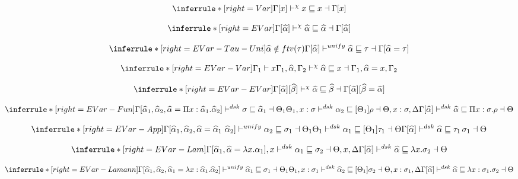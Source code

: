 \[
\inferrule*[right=Var]
{ }
{\Gamma[x] \dskunify x \sqsubseteq x \dashv \Gamma[x] }
\]

\[
\inferrule*[right=EVar]
{ }
{\Gamma[\widehat \alpha ] \dskunify \widehat \alpha \sqsubseteq \widehat \alpha \dashv \Gamma[\widehat \alpha] }
\]


\framebox{$\Gamma[\alpha] \dskunify \widehat \alpha \sqsubseteq \rho \dashv \Theta$}

\[
\inferrule*[right=EVar-Tau-Uni]
{ \widehat \alpha \notin ftv(\tau)} %
{\Gamma[\widehat \alpha ] \unify \widehat \alpha \sqsubseteq \tau \dashv \Gamma[\widehat \alpha=\tau]}
\]

\[
\inferrule*[right=EVar-Var]
{\Gamma_1 \vdash x}
{\Gamma_1, \widehat \alpha, \Gamma_2 \dskunify \widehat \alpha \sqsubseteq x \dashv \Gamma_1, \widehat \alpha=x, \Gamma_2 }
\]

\[
\inferrule*[right=EVar-EVar]
{ }
{\Gamma[\widehat \alpha][\widehat \beta] \dskunify \widehat \alpha \sqsubseteq \widehat \beta \dashv
\Gamma[\widehat \alpha][\widehat \beta = \widehat \alpha] }
\]

\[
\inferrule*[right=EVar-Fun]
{\Gamma[\widehat \alpha_1, \widehat \alpha_2, \widehat \alpha = \Pi x: \widehat \alpha_1. \widehat \alpha_2]
    \polymorphic  \sigma \sqsubseteq \widehat \alpha_1 \dashv \Theta_1 \\
\Theta_1, x: \sigma \polymorphicstar \alpha_2 \sqsubseteq [\Theta_1] \rho \dashv \Theta, x:\sigma, \Delta}
{\Gamma[\widehat \alpha] \polymorphicstar \widehat \alpha \sqsubseteq \Pi x:\sigma. \rho \dashv \Theta}
\]

\[
\inferrule*[right=EVar-App]
{
\Gamma[\widehat \alpha_1, \widehat \alpha_2, \widehat \alpha = \widehat \alpha_1~\widehat \alpha_2]
    \unify \alpha_2 \sqsubseteq \sigma_1 \dashv \Theta_1 \\
\Theta_1 \polymorphicstar \alpha_1 \sqsubseteq [\Theta_1]\tau_1 \dashv \Theta
}
{\Gamma[\widehat \alpha]\polymorphicstar \widehat \alpha \sqsubseteq \tau_1\, \sigma_1 \dashv \Theta}
\]

\[
\inferrule*[right=EVar-Lam]
{
\Gamma[\widehat \alpha_1, \widehat \alpha = \lambda x. \alpha_1], x \polymorphic \alpha_1 \sqsubseteq \sigma_2 \dashv \Theta, x, \Delta}
{\Gamma[\widehat \alpha] \polymorphicstar \widehat \alpha \sqsubseteq \lambda x. \sigma_2 \dashv \Theta }
\]


\[
\inferrule*[right=EVar-Lamann]
{
\Gamma[\widehat \alpha_1, \widehat \alpha_2, \widehat \alpha_1 = \lambda x:\widehat \alpha_1. \widehat \alpha_2]
\unify \widehat \alpha_1 \sqsubseteq \sigma_1 \dashv \Theta_1 \\
\Theta_1, x:\sigma_1 \polymorphic \widehat \alpha_2 \sqsubseteq [\Theta_1]\sigma_2 \dashv \Theta, x:\sigma_1, \Delta }
{\Gamma[\widehat \alpha]\polymorphicstar \widehat \alpha \sqsubseteq \lambda x:\sigma_1. \sigma_2 \dashv \Theta
}
\]

